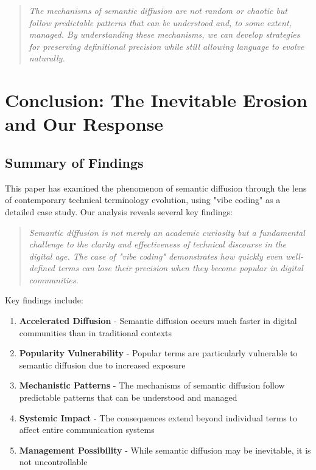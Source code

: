 \documentclass[11pt]{article}
\begin{document}
\begin{quote}
\emph{The mechanisms of semantic diffusion are not random or chaotic but follow predictable patterns that can be understood and, to some extent, managed. By understanding these mechanisms, we can develop strategies for preserving definitional precision while still allowing language to evolve naturally.}
\end{quote}

\section{Conclusion: The Inevitable Erosion and Our Response}

\subsection{Summary of Findings}

This paper has examined the phenomenon of semantic diffusion through the lens of contemporary technical terminology evolution, using "vibe coding" as a detailed case study. Our analysis reveals several key findings:

\begin{quote}
\emph{Semantic diffusion is not merely an academic curiosity but a fundamental challenge to the clarity and effectiveness of technical discourse in the digital age. The case of "vibe coding" demonstrates how quickly even well-defined terms can lose their precision when they become popular in digital communities.}
\end{quote}

Key findings include:

\begin{enumerate}
\item \textbf{Accelerated Diffusion} - Semantic diffusion occurs much faster in digital communities than in traditional contexts
\item \textbf{Popularity Vulnerability} - Popular terms are particularly vulnerable to semantic diffusion due to increased exposure
\item \textbf{Mechanistic Patterns} - The mechanisms of semantic diffusion follow predictable patterns that can be understood and managed
\item \textbf{Systemic Impact} - The consequences extend beyond individual terms to affect entire communication systems
\item \textbf{Management Possibility} - While semantic diffusion may be inevitable, it is not uncontrollable
\end{enumerate}
\end{document}
